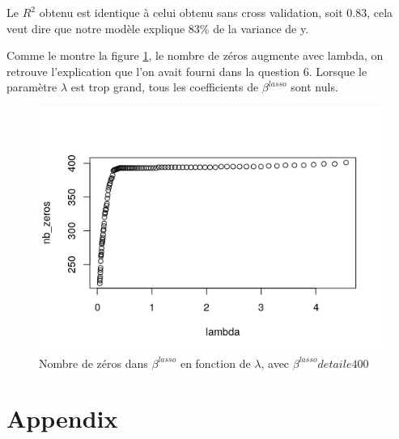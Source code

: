 \documentclass{article}
\begin{document}
	Le $R^{2}$ obtenu est identique à celui obtenu sans cross validation, soit 0.83, cela veut dire que notre modèle explique 83\% de la variance de y.

	Comme le montre la figure \ref{nb_zeros_cval}, le nombre de zéros augmente avec lambda, on retrouve l'explication que l'on avait fourni dans la question 6. Lorsque le paramètre $\lambda$ est trop grand, tous les coefficients de $\beta^{lasso}$ sont nuls.
	
	\begin{figure}[ht]
		\centering
		\caption{\label{nb_zeros_cval} Nombre de zéros dans $\beta^{lasso}$ en fonction de $\lambda$, avec $\beta^{lasso} de taile 400$}
		\includegraphics[scale=0.8]{nb_zeros_cval.png}
	\end{figure}

	
	
	
	
	\newpage
	\section{Appendix}


	\inputminted[breaklines, linenos]{R}{main.R}
	
	
	
\end{document}
